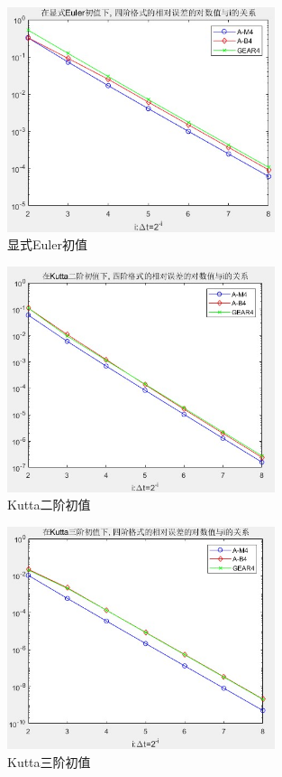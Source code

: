 \documentclass[12pt]{article}
\begin{document}
\begin{figure}[H]
	\centering
	\includegraphics[width=0.7\textwidth]{5}
	\caption{显式Euler初值}
\end{figure}
\begin{figure}[H]
	\centering
	\includegraphics[width=0.7\textwidth]{6}
	\caption{Kutta二阶初值}
\end{figure}
\begin{figure}[H]
	\centering
	\includegraphics[width=0.7\textwidth]{7}
	\caption{Kutta三阶初值}
\end{figure}
\end{document}
